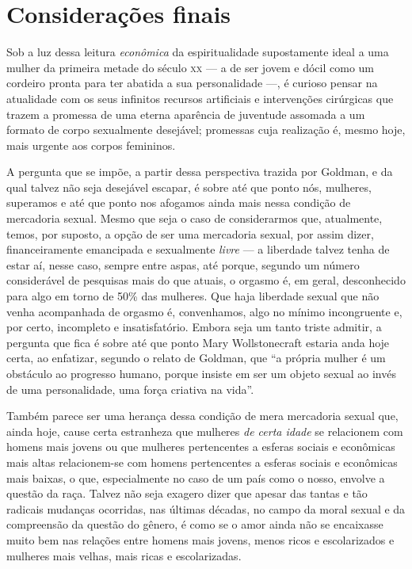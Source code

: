 \section{Considerações finais}

Sob a luz dessa leitura \textit{econômica} da espiritualidade
supostamente ideal a uma mulher da primeira metade do século \textsc{xx} --- a de
ser jovem e dócil como um cordeiro pronta para ter abatida a sua
personalidade ---, é curioso pensar na atualidade com os seus infinitos
recursos artificiais e intervenções cirúrgicas que trazem a promessa de
uma eterna aparência de juventude assomada a um formato de corpo
sexualmente desejável; promessas cuja realização é, mesmo hoje, mais
urgente aos corpos femininos.

A pergunta que se impõe, a partir dessa
perspectiva trazida por Goldman, e da qual talvez não seja desejável
escapar, é sobre até que ponto nós, mulheres, superamos e até que
ponto nos afogamos ainda mais nessa condição de mercadoria sexual. Mesmo
que seja o caso de considerarmos que, atualmente, temos, por suposto, a
opção de ser uma mercadoria sexual, por assim dizer, financeiramente
emancipada e sexualmente \textit{livre} --- a liberdade talvez tenha de estar
aí, nesse caso, sempre entre aspas, até porque, segundo um número
considerável de pesquisas mais do que atuais, o orgasmo é, em geral,
desconhecido para algo em torno de 50\% das mulheres. Que haja liberdade
sexual que não venha acompanhada de orgasmo é, convenhamos, algo no
mínimo incongruente e, por certo, incompleto e insatisfatório. Embora
seja um tanto triste admitir, a pergunta que fica é sobre até que
ponto Mary Wollstonecraft estaria anda hoje certa, ao enfatizar, segundo
o relato de Goldman, que ``a própria mulher é um obstáculo ao progresso
humano, porque insiste em ser um objeto sexual ao invés de uma
personalidade, uma força criativa na vida''.

Também parece ser uma herança dessa condição de mera mercadoria sexual
que, ainda hoje, cause certa estranheza que mulheres \textit{de certa idade}
se relacionem com homens mais jovens ou que mulheres pertencentes a
esferas sociais e econômicas mais altas relacionem-se com homens
pertencentes a esferas sociais e econômicas mais baixas, o que,
especialmente no caso de um país como o nosso, envolve a questão da
raça. Talvez não seja exagero dizer que apesar das tantas e tão radicais
mudanças ocorridas, nas últimas décadas, no campo da moral sexual e da
compreensão da questão do gênero, é como se o amor ainda não se
encaixasse muito bem nas relações entre homens mais jovens, menos ricos
e escolarizados e mulheres mais velhas, mais ricas e escolarizadas.

